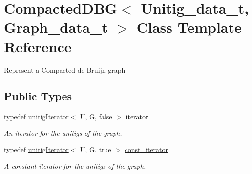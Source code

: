\hypertarget{classCompactedDBG}{}\section{Compacted\+D\+BG$<$ Unitig\+\_\+data\+\_\+t, Graph\+\_\+data\+\_\+t $>$ Class Template Reference}
\label{classCompactedDBG}


Represent a Compacted de Bruijn graph.  


\subsection*{Public Types}
\begin{DoxyCompactItemize}
\item 
typedef \hyperlink{classunitigIterator}{unitig\+Iterator}$<$ U, G, false $>$ \hyperlink{classCompactedDBG_af4a6df70628f698d9a2ee843b5359883}{iterator}
\begin{DoxyCompactList}\small\item\em An iterator for the unitigs of the graph. \end{DoxyCompactList}\item 
typedef \hyperlink{classunitigIterator}{unitig\+Iterator}$<$ U, G, true $>$ \hyperlink{classCompactedDBG_a7725fc78ad52227df1f70d9b8f44622c}{const\+\_\+iterator}
\begin{DoxyCompactList}\small\item\em A constant iterator for the unitigs of the graph. \end{DoxyCompactList}\end{DoxyCompactItemize}
